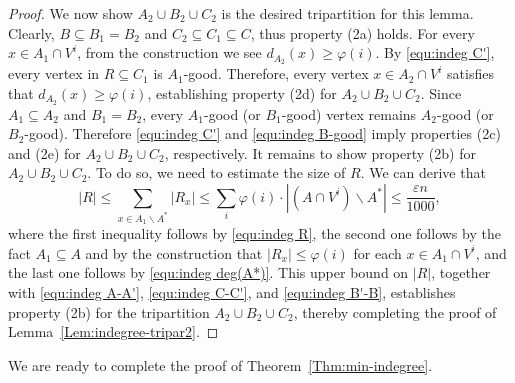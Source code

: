 \documentclass{aic}
\begin{document}
\begin{proof}
		We now show $A_2\cup B_2\cup C_2$ is the desired tripartition for this lemma.
		Clearly, $B\subseteq B_1=B_2$ and $C_2\subseteq C_1\subseteq C$, thus property (2a) holds.
		For every $x\in A_1\cap V^i$, from the construction we see $d_{A_2}(x)\geq \varphi(i)$.
		By \eqref{equ:indeg C'}, every vertex in $R\subseteq C_1$ is $A_1$-good.
		Therefore, every vertex $x\in A_2\cap V^i$ satisfies that $d_{A_2}(x)\ge \varphi(i)$,
		establishing property (2d) for $A_2\cup B_2\cup C_2$.
		Since $A_1\subseteq A_2$ and $B_1=B_2$,
		every $A_1$-good (or $B_1$-good) vertex remains $A_2$-good (or $B_2$-good).
		Therefore \eqref{equ:indeg C'} and \eqref{equ:indeg B-good} imply properties (2c) and (2e) for $A_2\cup B_2\cup C_2$, respectively.
		It remains to show property (2b) for $A_2\cup B_2\cup C_2$.
		To do so, we need to estimate the size of $R$.
		We can derive that
		$$|R|\le \sum_{x\in A_1\backslash A^*} |R_x|\le \sum_{i} \varphi(i)\cdot |(A\cap V^i)\backslash A^*|\le \frac{\varepsilon n}{1000},$$
		where the first inequality follows by \eqref{equ:indeg R}, the second one follows by the fact $A_1\subseteq A$ and by the construction that $|R_x|\leq \varphi(i)$ for each $x\in A_1\cap V^i$,
		and the last one follows by \eqref{equ:indeg deg(A*)}.
		This upper bound on $|R|$, together with \eqref{equ:indeg A-A'}, \eqref{equ:indeg C-C'}, and \eqref{equ:indeg B'-B},
		establishes property (2b) for the tripartition $A_2 \cup B_2 \cup C_2$, thereby completing the proof of Lemma~\ref{Lem:indegree-tripar2}.
	\end{proof}
	
	
	We are ready to complete the proof of Theorem~\ref{Thm:min-indegree}.
	
	\medskip
	
\end{document}

